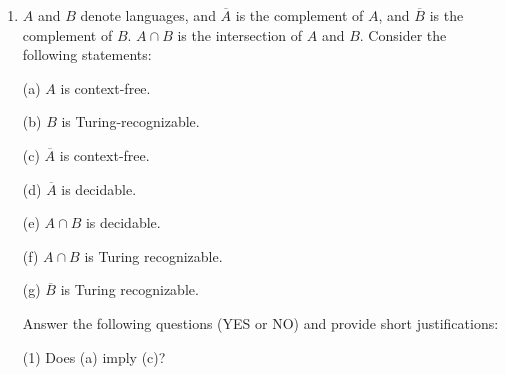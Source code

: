 \documentclass[11pt]{article}
\begin{document}
\begin{enumerate}[label=\textbf{Exercise \arabic{*}}]
        $S$ on input $\langle M \rangle$, where $\langle M \rangle$ is a TM, initializes a counter to 0. Then, $S$ simulates $M$ on each of the characters of $\Sigma^*$ sorted in lexicographical order. That is, $S$ performs a simulation of $M$ on each of the elements of $A = (\epsilon, 0, 1, 00, 01, 10, 11, \ldots)$. Because it is possible that $M$ may loop on some particular input, rather than explicitly accepting or rejecting it, we will further specify that the simulation $S$ performs of $M$ on the strings from $A$ are done using dovetailing. Concretely this means that for each element of the sequence $A$ ($s_1, s_2, \ldots, s_i$) the algorithm $S$ will simulate $M$ for $i$ steps before proceeding. To illustrate, $M$ will be simulated for $1$ step on the $\epsilon = s_1$, then $M$ will be simulated for $2$ steps on $\epsilon = s_1$ and $0 = s_2$, and so forth. This ensures that the sequence of simulations of $M$ will be able to proceed through all of the inputs. Whenever $M$ accepts on a particular input, increment the counter $c$ of $S$. If the counter $c \ge 3$, then $S$ accepts. Otherwise, $S$ will loop. This satisfies the requirement that $S$ be Turing Recognizable, i.e. recursively enumerable.

  \item $A$ and $B$ denote languages, and $\overline{A}$ is the complement of $A$, and $\overline{B}$ is the complement of $B$.  $A \cap B$ is the intersection of $A$ and $B$. Consider the following statements:

        (a) $A$ is context-free.

        (b) $B$ is Turing-recognizable.

        (c) $\overline{A}$ is context-free.

        (d)	$\overline{A}$ is decidable.

        (e) $A \cap B$ is decidable.

        (f) $A \cap B$ is  Turing recognizable.

        (g) $\overline{B}$ is Turing recognizable.
        \smallskip

        Answer the following questions (YES or NO) and provide short justifications:
        \smallskip

        (1) Does (a) imply (c)?


\end{enumerate}
\end{document}
